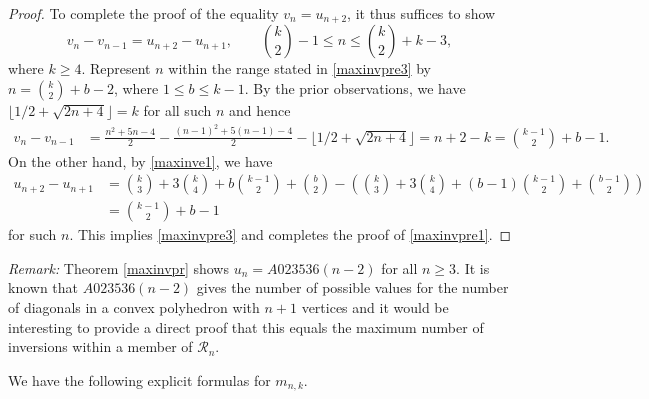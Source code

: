 \documentclass[11pt,a4paper]{article}
\begin{document}
\begin{proof}
To complete the proof of the equality $v_n=u_{n+2}$, it thus suffices to show
\begin{equation}\label{maxinvpre3}
v_n-v_{n-1}=u_{n+2}-u_{n+1}, \qquad \binom{k}{2}-1 \leq n \leq \binom{k}{2}+k-3,
\end{equation}
where $k \geq 4$.  Represent $n$ within the range stated in \eqref{maxinvpre3} by  $n=\binom{k}{2}+b-2$, where $1 \leq b \leq k-1$.
By the prior observations, we have $\lfloor 1/2+\sqrt{2n+4}\rfloor =k$ for all such $n$ and hence
\begin{align*}
v_n-v_{n-1}&=\frac{n^2+5n-4}{2}-\frac{(n-1)^2+5(n-1)-4}{2}-\lfloor 1/2+\sqrt{2n+4}\rfloor=n+2-k=\binom{k-1}{2}+b-1.
\end{align*}
On the other hand, by \eqref{maxinve1}, we have
\begin{align*}
u_{n+2}-u_{n+1}&=\binom{k}{3}+3\binom{k}{4}+b\binom{k-1}{2}+\binom{b}{2}-\left(\binom{k}{3}+3\binom{k}{4}+(b-1)\binom{k-1}{2}+\binom{b-1}{2}\right)\\
&=\binom{k-1}{2}+b-1
\end{align*}
for such $n$. This implies \eqref{maxinvpre3} and completes the proof of \eqref{maxinvpre1}.
\end{proof}

\noindent \emph{Remark:} Theorem \ref{maxinvpr} shows $u_{n}=A023536(n-2)$ for all $n \geq 3$.  It is known that $A023536(n-2)$ gives the number of possible values for the number of diagonals in a convex polyhedron with $n+1$ vertices and it would be interesting to provide a direct proof that this equals the maximum number of inversions within a member of $\mathcal{R}_{n}$. \medskip

We have the following explicit formulas for $m_{n,k}$.
\end{document}
